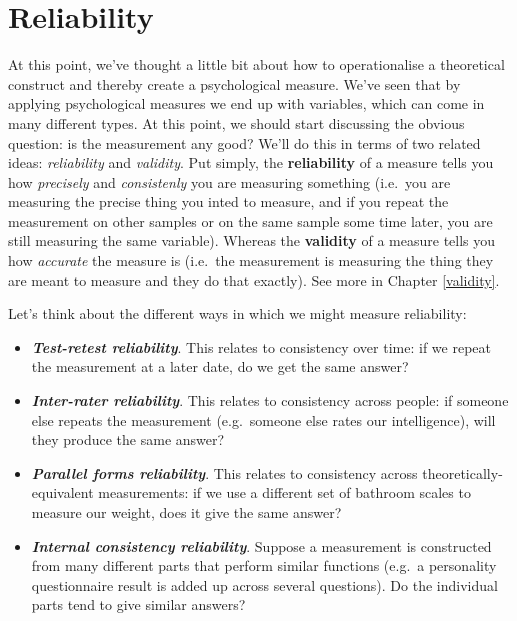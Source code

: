 \documentclass[
  11pt,
]{book}
\providecommand{\tightlist}{%
  \setlength{\itemsep}{0pt}\setlength{\parskip}{0pt}}
\theoremstyle{indenteddefinition}
\theoremstyle{indenteddefinition}
\theoremstyle{definition}
\theoremstyle{definition}
\theoremstyle{remark}
\begin{document}
\hypertarget{reliability}{%
\section{Reliability}\label{reliability}}

At this point, we've thought a little bit about how to operationalise a theoretical construct and thereby create a psychological measure. We've seen that by applying psychological measures we end up with variables, which can come in many different types. At this point, we should start discussing the obvious question: is the measurement any good? We'll do this in terms of two related ideas: \emph{reliability} and \emph{validity}. Put simply, the \textbf{reliability} of a measure tells you how \emph{precisely} and \emph{consistenly} you are measuring something (i.e.~you are measuring the precise thing you inted to measure, and if you repeat the measurement on other samples or on the same sample some time later, you are still measuring the same variable). Whereas the \textbf{validity} of a measure tells you how \emph{accurate} the measure is (i.e.~the measurement is measuring the thing they are meant to measure and they do that exactly). See more in Chapter \ref{validity}.

Let's think about the different ways in which we might measure reliability:

\begin{itemize}
\tightlist
\item
  \textbf{\emph{Test-retest reliability}}. This relates to consistency over time: if we repeat the measurement at a later date, do we get the same answer?
\item
  \textbf{\emph{Inter-rater reliability}}. This relates to consistency across people: if someone else repeats the measurement (e.g.~someone else rates our intelligence), will they produce the same answer?
\item
  \textbf{\emph{Parallel forms reliability}}. This relates to consistency across theoretically-equivalent measurements: if we use a different set of bathroom scales to measure our weight, does it give the same answer?
\item
  \textbf{\emph{Internal consistency reliability}}. Suppose a measurement is constructed from many different parts that perform similar functions (e.g.~a personality questionnaire result is added up across several questions). Do the individual parts tend to give similar answers?
\end{itemize}
\end{document}
